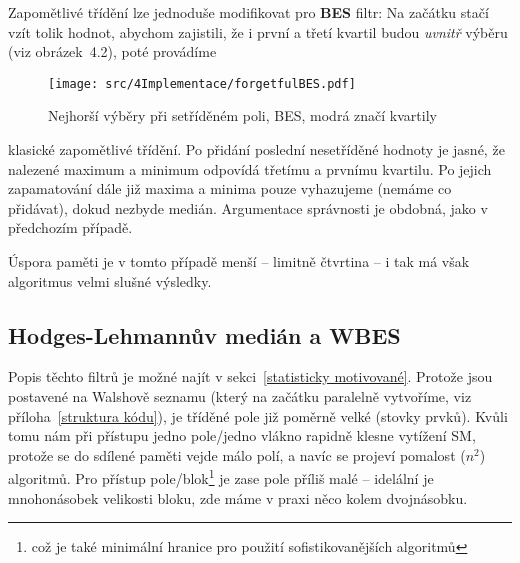         Zapomětlivé třídění lze jednoduše modifikovat pro \textbf{BES} filtr: Na začátku stačí vzít tolik hodnot, abychom zajistili, že i první a třetí kvartil budou \emph{uvnitř} výběru (viz obrázek~4.2), poté provádíme
        \begin{figure}[h]
        \begin{center}
          \texttt{[image: src/4Implementace/forgetfulBES.pdf]}
          \caption{Nejhorší výběry při setříděném poli, BES, modrá značí kvartily}
          \end{center}
        \end{figure}\label{obr forget BES}
        klasické zapomětlivé třídění. Po přidání poslední nesetříděné hodnoty je jasné, že nalezené maximum a minimum odpovídá třetímu a prvnímu kvartilu. Po jejich zapamatování dále již maxima a minima pouze vyhazujeme (nemáme co přidávat), dokud nezbyde medián. Argumentace správnosti je obdobná, jako v předchozím případě.

        Úspora paměti je v tomto případě menší -- limitně čtvrtina -- i tak má však algoritmus velmi slušné výsledky.

    \subsection{Hodges-Lehmannův medián a WBES}

     Popis těchto filtrů je možné najít v sekci~\ref{statisticky motivované}. Protože jsou postavené na Walshově seznamu (který na začátku paralelně vytvoříme, viz příloha~\ref{struktura kódu}), je tříděné pole již poměrně velké (stovky prvků). Kvůli tomu nám při přístupu jedno pole/jedno vlákno rapidně klesne vytížení SM, protože se do sdílené paměti vejde málo polí, a navíc se projeví pomalost \OOO($n^2$) algoritmů. Pro přístup pole/blok\footnote{což je také minimální hranice pro použití sofistikovanějších algoritmů} je zase pole příliš malé -- idelální je mnohonásobek velikosti bloku, zde máme v praxi něco kolem dvojnásobku.

